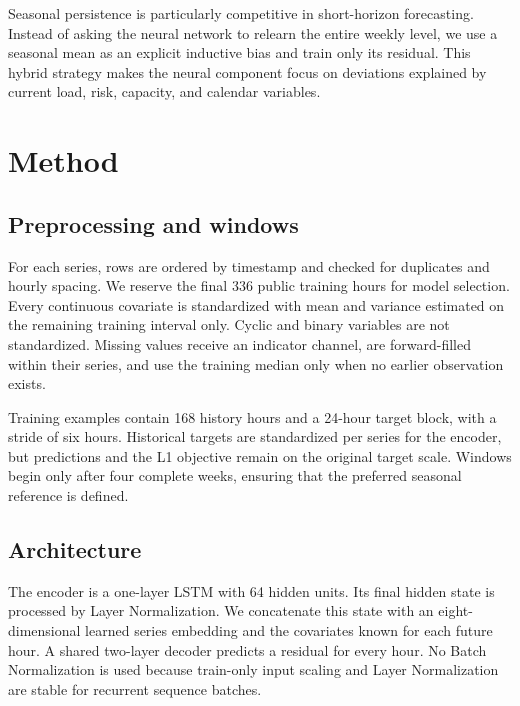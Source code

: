 \documentclass[10pt,a4paper]{article}
\begin{document}
Seasonal persistence is particularly competitive in short-horizon forecasting.
Instead of asking the neural network to relearn the entire weekly level, we use
a seasonal mean as an explicit inductive bias and train only its residual. This
hybrid strategy makes the neural component focus on deviations explained by
current load, risk, capacity, and calendar variables.

\section{Method}
\subsection{Preprocessing and windows}
For each series, rows are ordered by timestamp and checked for duplicates and
hourly spacing. We reserve the final 336 public training hours for model
selection. Every continuous covariate is standardized with mean and variance
estimated on the remaining training interval only. Cyclic and binary variables
are not standardized. Missing values receive an indicator channel, are
forward-filled within their series, and use the training median only when no
earlier observation exists.

Training examples contain 168 history hours and a 24-hour target block, with a
stride of six hours. Historical targets are standardized per series for the
encoder, but predictions and the L1 objective remain on the original target
scale. Windows begin only after four complete weeks, ensuring that the preferred
seasonal reference is defined.

\subsection{Architecture}
The encoder is a one-layer LSTM with 64 hidden units. Its final hidden state is
processed by Layer Normalization. We concatenate this state with an
eight-dimensional learned series embedding and the covariates known for each
future hour. A shared two-layer decoder predicts a residual for every hour. No
Batch Normalization is used because train-only input scaling and Layer
Normalization are stable for recurrent sequence batches.
\end{document}
